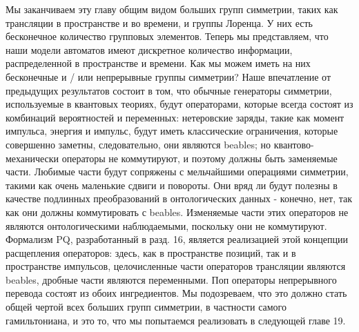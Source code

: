 \documentclass[main.tex]{subfiles}
\begin{document}
Мы заканчиваем эту главу общим видом больших групп симметрии, таких как трансляции в пространстве и во времени, и группы Лоренца. У них есть бесконечное количество групповых элементов. Теперь мы представляем, что наши модели автоматов имеют дискретное количество информации, распределенной в пространстве и времени. Как мы можем иметь на них бесконечные и / или непрерывные группы симметрии?
Наше впечатление от предыдущих результатов состоит в том, что обычные генераторы симметрии, используемые в квантовых теориях, будут операторами, которые всегда состоят из комбинаций вероятностей и переменных: нетеровские заряды, такие как момент импульса, энергия и импульс, будут иметь классические ограничения, которые совершенно заметны, следовательно, они являются beables; но квантово-механически операторы не коммутируют, и поэтому должны быть заменяемые части.
Любимые части будут сопряжены с мельчайшими операциями симметрии, такими как очень маленькие сдвиги и повороты. Они вряд ли будут полезны в качестве подлинных преобразований в онтологических данных - конечно, нет, так как они должны коммутировать с beables.
Изменяемые части этих операторов не являются онтологическими наблюдаемыми, поскольку они не коммутируют. Формализм PQ, разработанный в разд. 16, является реализацией этой концепции расщепления операторов: здесь, как в пространстве позиций, так и в пространстве импульсов, целочисленные части операторов трансляции являются beables, дробные части являются переменными. Поп операторы непрерывного перевода состоят из обоих ингредиентов. Мы подозреваем, что это должно стать общей чертой всех больших групп симметрии, в частности самого гамильтониана, и это то, что мы попытаемся реализовать в следующей главе 19.



\begin{equation}\label{18.}
	
\end{equation}

\begin{equation}\label{18.}
	
\end{equation}

\begin{equation}\label{18.}
	
\end{equation}

\begin{equation}\label{18.}
	
\end{equation}
\end{document}
